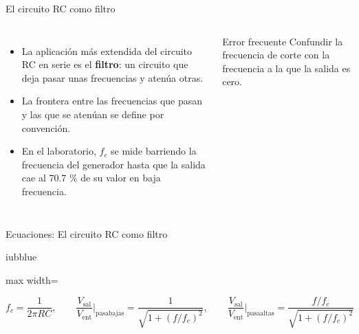 \documentclass[aspectratio=169,11pt,xcolor={table}]{beamer}
\begin{document}
\begin{frame}{El circuito RC como filtro}
\begin{columns}[c,onlytextwidth]
\small
\begin{itemize}\setlength{\itemsep}{4pt}
  \item La aplicación más extendida del circuito RC en serie es el \textbf{filtro}: un circuito que deja pasar unas frecuencias y atenúa otras.
  \item La frontera entre las frecuencias que pasan y las que se atenúan se define por convención.
  \item En el laboratorio, $f_c$ se mide barriendo la frecuencia del generador hasta que la salida cae al 70.7 \% de su valor en baja frecuencia.
\end{itemize}
\begin{cardO}{Error frecuente}
\footnotesize Confundir la frecuencia de corte con la frecuencia a la que la salida es cero.
\end{cardO}
\end{columns}
\end{frame}

\begin{frame}{Ecuaciones: El circuito RC como filtro}
\begin{cajaplana}{iubblue}
\centering
\begin{adjustbox}{max width=\linewidth}
\begin{minipage}{2.00\linewidth}
{\large
\begin{equation*}
  f_c = \frac{1}{2\pi R C}, \qquad \frac{V_{\mathrm{sal}}}{V_{\mathrm{ent}}}\bigg|_{\mathrm{pasabajas}} = \frac{1}{\sqrt{1 + (f/f_c)^{2}}}, \qquad \frac{V_{\mathrm{sal}}}{V_{\mathrm{ent}}}\bigg|_{\mathrm{pasaaltas}} = \frac{f/f_c}{\sqrt{1 + (f/f_c)^{2}}}
\end{equation*}
}
\end{minipage}
\end{adjustbox}
\end{cajaplana}
\end{frame}
\end{document}
